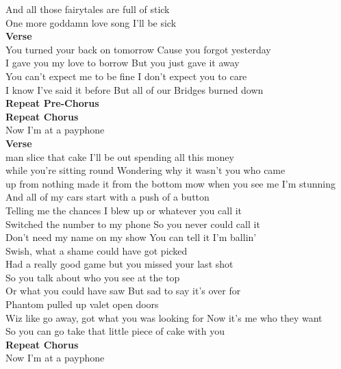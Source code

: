 And all those fairytales are full of stick\\
One more goddamn love song I'll be sick\\
\textbf{Verse}\\
 You turned your back on tomorrow Cause you forgot yesterday\\
I gave you my love to borrow But you just gave it away\\
You can't expect me to be fine  I don't expect you to care\\
I know I've said it before But all of our Bridges burned down\\
\textbf{Repeat Pre-Chorus}\\
\textbf{Repeat Chorus}\\
Now I'm at a payphone\\
\textbf{Verse}\\
man slice that cake I'll be out spending all this money\\
while you're sitting round Wondering why it wasn't you who came \\
up from nothing made it from the bottom mow when you see me I'm stunning\\
And all of my cars start with a push of a button\\
Telling me the chances I blew up or whatever you call it\\
Switched the number to my phone So you never could call it\\
Don't need my name on my show You can tell it I'm ballin'\\
Swish, what a shame could have got picked\\
Had a really good game but you missed your last shot\\
So you talk about who you see at the top\\
Or what you could have saw But sad to say it's over for\\
Phantom pulled up valet open doors\\
Wiz like go away, got what you was looking for Now it's me who they want\\
So you can go take that little piece of cake with you\\
\textbf{Repeat Chorus}\\
Now I'm at a payphone\\

